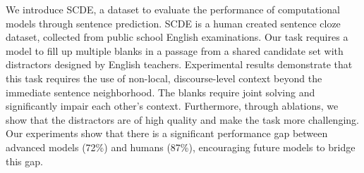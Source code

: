 We introduce SCDE, a dataset to evaluate the performance of computational models through sentence prediction. SCDE is a human created sentence cloze dataset, collected from public school English examinations. Our task requires a model to fill up multiple blanks in a passage from a shared candidate set with distractors designed by English teachers. Experimental results demonstrate that this task requires the use of non-local, discourse-level context beyond the immediate sentence neighborhood. The blanks require joint solving and significantly impair each other's context. Furthermore, through ablations, we show that the distractors are of high quality and make the task more challenging. Our experiments show that there is a significant performance gap between advanced models (72\%) and humans (87\%), encouraging future models to bridge this gap.
